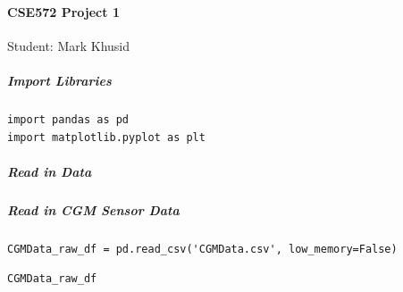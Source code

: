 \paragraph{CSE572 Project 1}

Student: Mark Khusid \newline

\subparagraph{Import Libraries}

\begin{verbatim}
import pandas as pd
import matplotlib.pyplot as plt
\end{verbatim}

\subparagraph{Read in Data}

\subparagraph{Read in CGM Sensor Data}

\begin{verbatim}
CGMData_raw_df = pd.read_csv('CGMData.csv', low_memory=False)
\end{verbatim}

\begin{verbatim}
CGMData_raw_df
\end{verbatim}

